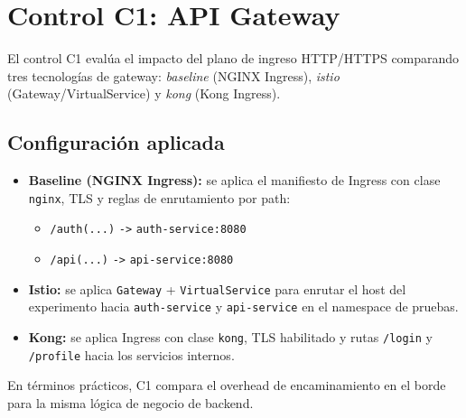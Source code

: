 
\section{Control C1: API Gateway}
\label{sec:c1-api-gateway}

El control C1 eval\'ua el impacto del plano de ingreso HTTP/HTTPS comparando tres tecnolog\'ias de gateway: \textit{baseline} (NGINX Ingress), \textit{istio} (Gateway/VirtualService) y \textit{kong} (Kong Ingress).

\subsection{Configuraci\'on aplicada}

\begin{itemize}
  \item \textbf{Baseline (NGINX Ingress):} se aplica el manifiesto de Ingress con clase \texttt{nginx}, TLS y reglas de enrutamiento por path:
  \begin{itemize}
    \item \texttt{/auth(...)} \texttt{->} \texttt{auth-service:8080}
    \item \texttt{/api(...)} \texttt{->} \texttt{api-service:8080}
  \end{itemize}

  \item \textbf{Istio:} se aplica \texttt{Gateway} + \texttt{VirtualService} para enrutar el host del experimento hacia \texttt{auth-service} y \texttt{api-service} en el namespace de pruebas.

  \item \textbf{Kong:} se aplica Ingress con clase \texttt{kong}, TLS habilitado y rutas \texttt{/login} y \texttt{/profile} hacia los servicios internos.
\end{itemize}

En t\'erminos pr\'acticos, C1 compara el overhead de encaminamiento en el borde para la misma l\'ogica de negocio de backend.
